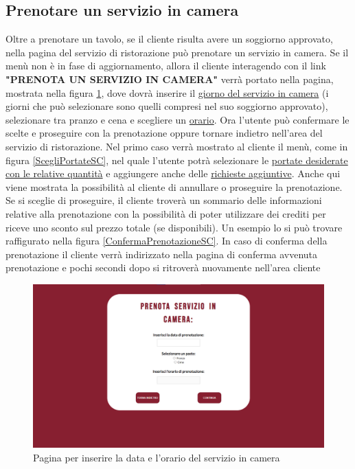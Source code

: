 \documentclass [a4paper, 12pt]{book}
\begin{document}
\subsection{Prenotare un servizio in camera}
Oltre a prenotare un tavolo, se il cliente risulta avere un soggiorno approvato, nella pagina del servizio di ristorazione può prenotare un servizio in camera. Se il menù non è in fase di aggiornamento, allora il cliente interagendo con il link \textbf{"PRENOTA UN SERVIZIO IN CAMERA"} verrà portato nella pagina, mostrata nella figura \ref{PrenotaSC}, dove dovrà inserire il \underline{giorno del servizio in camera} (i giorni che può selezionare sono quelli compresi nel suo soggiorno approvato), selezionare tra pranzo e cena e scegliere un \underline{orario}. Ora l'utente può confermare le scelte e proseguire con la prenotazione oppure tornare indietro nell'area del servizio di ristorazione. Nel primo caso verrà mostrato al cliente il menù, come in figura \ref{ScegliPortateSC}, nel quale l'utente potrà selezionare le \underline{portate desiderate con le relative quantità} e aggiungere anche delle \underline{richieste aggiuntive}. Anche qui viene mostrata la possibilità al cliente di annullare o proseguire la prenotazione. Se si sceglie di proseguire, il cliente troverà un sommario delle informazioni relative alla prenotazione con la possibilità di poter utilizzare dei crediti per riceve uno sconto sul prezzo totale (se disponibili). Un esempio lo si può trovare raffigurato nella figura \ref{ConfermaPrenotazioneSC}. In caso di conferma della prenotazione il cliente verrà indirizzato nella pagina di conferma avvenuta prenotazione e pochi secondi dopo si ritroverà nuovamente nell'area cliente\newpage
\begin{figure}[!h]
\centering
\includegraphics[scale=0.3]{PrenotaSC.png}
\caption{Pagina per inserire la data e l'orario del servizio in camera}
\label{PrenotaSC}
\end{figure}
\end{document}
